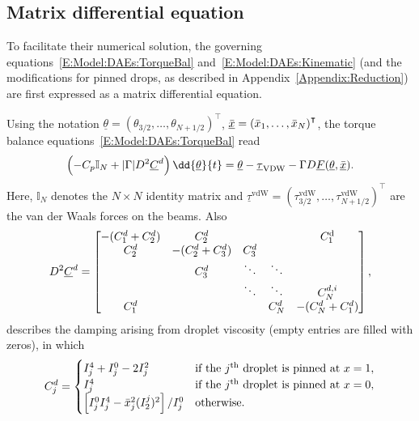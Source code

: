 \begin{subappendices}
\section{Matrix differential equation}\label{Appendix:MatrixDifferentialEquation}
To facilitate their numerical solution, the governing equations~\eqref{E:Model:DAEs:TorqueBal} and~\eqref{E:Model:DAEs:Kinematic} (and the modifications for pinned drops, as described in Appendix~\ref{Appendix:Reduction}) are first expressed as a matrix differential equation.

Using the notation $\underline{\theta} = \left(\theta_{3/2},\dots, \theta_{N+1/2}\right)^\intercal$, $ \underline{\bar{x}} = \left(\bar{x}_1,\dots, \bar{x}_N\right)^\intercal$, the torque balance equations~\eqref{E:Model:DAEs:TorqueBal} read
\begin{equation}\label{A:E:MDE:TorqueBalance}
\left(-C_p\mathbb{I }_N+ |\Gamma| D^2 \underline{C}^d\right)\dd{\underline{\theta}}{t} = \underline{\theta} - \underline{\tau}_{\text{VDW}} - \Gamma D \underline{F}( \underline{\theta},  \underline{\xbar}).
\end{equation}
Here, $\mathbb{I}_N$ denotes the $N \times N$ identity matrix and $\underline{\tau}^{\text{vdW}} = (\tau^{\text{vdW}}_{3/2},\dots, \tau^{\text{vdW}}_{N+1/2})^\intercal$ are the van der Waals forces on the beams.  Also
\begin{equation}\label{A:E:MDE:ViscousLaplacian}
D^2 \underline{C}^d =  \begin{bmatrix}
-(C^d_1 +C^d_2) & C^d_2   & & & C^{\text{d}}_1 \\
C^d_2 & -(C^d_2 +C^d_3) & C^d_3  \\
 & C^d_3 & \ddots & \ddots \\
& & \ddots & \ddots & C^{d,i}_N \\
C^d_1& & &C^d_N&- (C^d_{N} +C^d_{1})
\end{bmatrix},
\end{equation}
describes the damping arising from droplet viscosity (empty entries are filled with zeros), in which
\begin{equation}
C^{d}_j = \begin{cases}
I_j^4 + I_j^0 - 2I_j^2 & \text{if the}~j^{\text{th}}~\text{droplet is pinned at} ~ x = 1,\\
I_j^4 &\text{if the}~j^{\text{th}}~\text{droplet is pinned at} ~ x = 0,\\
\left[I_j^0 I_j^4 - \bar{x}_j^2 (I_2^j)^2\right]/I_j^0 &\text{otherwise}.
\end{cases}
\end{equation}

\end{subappendices}
